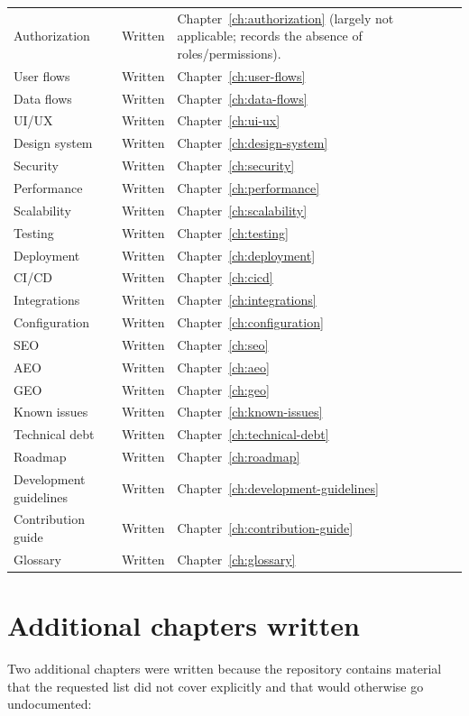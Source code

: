 \begin{longtable}{@{}L{4.6cm}L{2.7cm}L{7.1cm}@{}}
Authorization & Written & Chapter~\ref{ch:authorization} (largely not applicable;
records the absence of roles/permissions). \\
User flows & Written & Chapter~\ref{ch:user-flows} \\
Data flows & Written & Chapter~\ref{ch:data-flows} \\
UI/UX & Written & Chapter~\ref{ch:ui-ux} \\
Design system & Written & Chapter~\ref{ch:design-system} \\
Security & Written & Chapter~\ref{ch:security} \\
Performance & Written & Chapter~\ref{ch:performance} \\
Scalability & Written & Chapter~\ref{ch:scalability} \\
Testing & Written & Chapter~\ref{ch:testing} \\
Deployment & Written & Chapter~\ref{ch:deployment} \\
CI/CD & Written & Chapter~\ref{ch:cicd} \\
Integrations & Written & Chapter~\ref{ch:integrations} \\
Configuration & Written & Chapter~\ref{ch:configuration} \\
SEO & Written & Chapter~\ref{ch:seo} \\
AEO & Written & Chapter~\ref{ch:aeo} \\
GEO & Written & Chapter~\ref{ch:geo} \\
Known issues & Written & Chapter~\ref{ch:known-issues} \\
Technical debt & Written & Chapter~\ref{ch:technical-debt} \\
Roadmap & Written & Chapter~\ref{ch:roadmap} \\
Development guidelines & Written & Chapter~\ref{ch:development-guidelines} \\
Contribution guide & Written & Chapter~\ref{ch:contribution-guide} \\
Glossary & Written & Chapter~\ref{ch:glossary} \\
\bottomrule
\end{longtable}

\section{Additional chapters written}

Two additional chapters were written because the repository contains material
that the requested list did not cover explicitly and that would otherwise go
undocumented:

